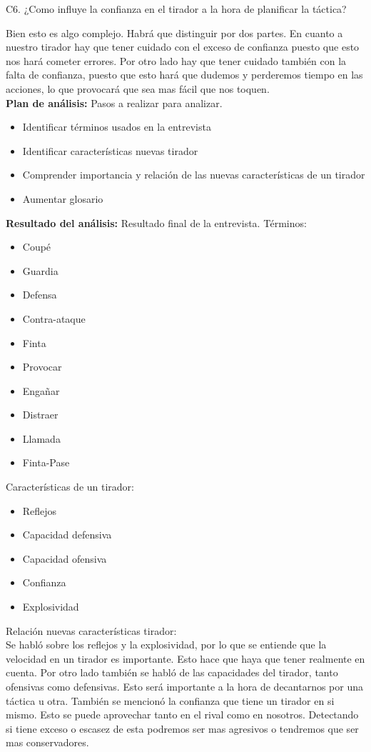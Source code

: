 C6. ¿Como influye la confianza en el tirador a la hora de planificar la táctica?

Bien esto es algo complejo. Habrá que distinguir por dos partes. En cuanto a nuestro tirador
hay que tener cuidado con el exceso de confianza puesto que esto nos hará cometer errores.
Por otro lado hay que tener cuidado también con la falta de confianza, puesto que esto hará
que dudemos y perderemos tiempo en las acciones, lo que provocará que sea mas fácil que nos toquen.
\\

\textbf{Plan de análisis:} Pasos a realizar para analizar.
\begin{itemize}
  \item Identificar términos usados en la entrevista
  \item Identificar características nuevas tirador
  \item Comprender importancia y relación de las nuevas características de un tirador
  \item Aumentar glosario
\end{itemize}


\textbf{Resultado del análisis:} Resultado final de la entrevista.
Términos:
\begin{itemize}
  \item Coupé
  \item Guardia
  \item Defensa
  \item Contra-ataque
  \item Finta
  \item Provocar
  \item Engañar
  \item Distraer
  \item Llamada
  \item Finta-Pase
\end{itemize}

Características de un tirador:
\begin{itemize}
  \item Reflejos
  \item Capacidad defensiva
  \item Capacidad ofensiva
  \item Confianza
  \item Explosividad
\end{itemize}

Relación nuevas características tirador: \\
Se habló sobre los reflejos y la explosividad, por lo que se entiende que la velocidad
en un tirador es importante. Esto hace que haya que tener realmente en cuenta.
Por otro lado también se habló de las capacidades del tirador, tanto ofensivas como defensivas.
Esto será importante a la hora de decantarnos por una táctica u otra.
También se mencionó la confianza que tiene un tirador en si mismo. Esto se puede aprovechar
tanto en el rival como en nosotros. Detectando si tiene exceso o escasez de esta podremos ser
mas agresivos o tendremos que ser mas conservadores.
